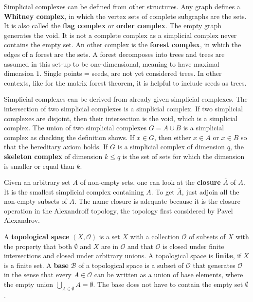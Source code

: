 \documentclass[12pt]{amsart}
\begin{document}
\vspace{3mm}
Simplicial complexes can be defined from other structures. Any graph defines a {\bf Whitney complex}, in which 
the vertex sets of complete subgraphs are the sets. It is also called the {\bf flag complex} or {\bf order complex}.
The empty graph generates the void. It is not a complete complex as a simplicial complex never contains
the empty set. An other complex is the {\bf forest complex}, in which the edges of a forest are the sets. 
A forest decomposes into trees and trees are assumed in this set-up to be one-dimensional, meaning to 
have maximal dimension $1$. Single points = seeds, are not yet considered trees. In other contexts, like
for the matrix forest theorem, it is helpful to include seeds as trees. 

\vspace{3mm}
Simplicial complexes can be derived from already given simplicial complexes.
The intersection of two simplicial complexes is a simplicial complex. If two simplicial complexes are
disjoint, then their intersection is the void, which is a simplicial complex. 
The union of two simplicial complexes $G=A \cup B$ is a simplicial complex as checking the definition shows.
If $x \in G$, then either $x \in A$ or $x \in B$ so that the hereditary axiom holds. 
If $G$ is a simplicial complex of dimension $q$, the {\bf skeleton complex} of dimension $k \leq q$ is the 
set of sets for which the dimension is smaller or equal than $k$. 

\vspace{3mm}
Given an arbitrary set $A$ of non-empty sets, one can look at the {\bf closure}
$\overline{A}$ of $A$. It is the smallest simplicial complex containing $A$. 
To get $\overline{A}$, just adjoin all the non-empty subsets of $A$. 
The name closure is adequate because it is the closure operation in the Alexandroff
topology, the topology first considered by Pavel Alexandrov. 


\vspace{3mm}
A {\bf topological space} $(X,\mathcal{O})$ is a set $X$
with a collection $\mathcal{O}$ of subsets of $X$ with the
property that both $\emptyset$ and $X$ are in $\mathcal{O}$ and that
$\mathcal{O}$ is closed under finite intersections and closed
under arbitrary unions. A topological space is {\bf finite}, if $X$
is a finite set. A {\bf base} $\mathcal{B}$ of a topological space is a subset
of $\mathcal{O}$ that generates $\mathcal{O}$ in the sense 
that every $A \in \mathcal{O}$ can be written as a union of
base elements, where the empty union $\bigcup_{A \in \emptyset} A=\emptyset$. 
The base does not have to contain the empty set $\emptyset$. 
\end{document}
